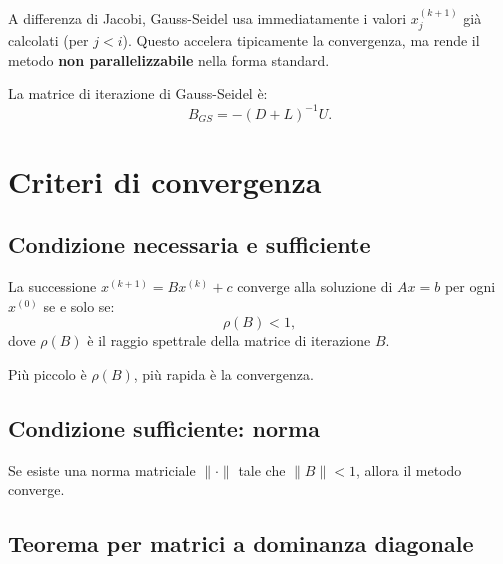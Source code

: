 \begin{remark}
A differenza di Jacobi, Gauss-Seidel usa immediatamente i valori $x_j^{(k+1)}$ già
calcolati (per $j < i$). Questo accelera tipicamente la convergenza, ma rende il
metodo \textbf{non parallelizzabile} nella forma standard.
\end{remark}

La matrice di iterazione di Gauss-Seidel è:
\begin{equation}
  B_{GS} = -(D + L)^{-1}U.
  \label{eq:B_gs}
\end{equation}

\section{Criteri di convergenza}
\label{sec:convergenza}

\subsection{Condizione necessaria e sufficiente}

\begin{theorem}
\label{thm:conv_iter}
La successione $x^{(k+1)} = Bx^{(k)} + c$ converge alla soluzione di $Ax = b$
per ogni $x^{(0)}$ se e solo se:
\begin{equation}
  \rho(B) < 1,
  \label{eq:conv_cond}
\end{equation}
dove $\rho(B)$ è il raggio spettrale della matrice di iterazione $B$.
\end{theorem}

Più piccolo è $\rho(B)$, più rapida è la convergenza.

\subsection{Condizione sufficiente: norma}

\begin{corollary}
Se esiste una norma matriciale $\|\cdot\|$ tale che $\|B\| < 1$, allora il metodo
converge.
\end{corollary}

\subsection{Teorema per matrici a dominanza diagonale}

